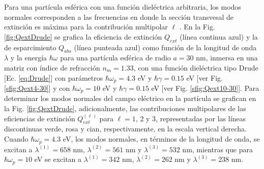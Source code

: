 Para una partícula esférica con una función dieléctrica arbitraria, los modos normales corresponden a las frecuencias en donde la sección transvesal de extinción es máxima para la contribución multipolar $\ell$ \cite{kreibig1995clusters}. En la Fig. \ref{fig:QextDrude} se grafica la eficiencia de extinción $Q_{ext}$ (línea continua azul) y la de esparcimiento $Q_{abs}$ (línea punteada azul) como función de la longitud de onda $\lambda$ y la energía $\hbar\omega$ para una partícula esférica de radio $a=30$ nm, inmersa en una matriz con índice de refracción $n_m=1.33$, con una función dieléctrica tipo Drude [Ec. \eqref{eq:Drude}] con parámetros $\hbar\omega_p=4.3$ eV y $\hbar\gamma = 0.15$ eV [ver Fig. \ref{sfig:Qext4-30}] y con $\hbar\omega_p=10$ eV y $\hbar\gamma = 0.15$ eV [ver Fig. \ref{sfig:Qext10-30}]. Para determinar los modos normales del campo eléctrico en la partícula se grafican en la Fig. \ref{fig:QextDrude}, adicionalmente, las contribuciones multipolares de las eficiencias de extinción $Q_{ext}^{(\ell)}$ para $\ell = 1,\,2$ y $3$, representadas por las líneas discontinuas verde, rosa y cian, respectivamente, en la escala vertical derecha. Cuando $\hbar\omega_p = 4.3$ eV, los modos normales, en términos de la longitud de onda, se excitan a $\lambda^{(1)}= 658$ nm, $\lambda^{(2)}= 561$ nm y $\lambda^{(3)}= 532 $ nm, mientras que para $\hbar\omega_p = 10$ eV se excitan a $\lambda^{(1)}= 342$ nm, $\lambda^{(2)}= 262$ nm y $\lambda^{(3)}= 238$ nm.

